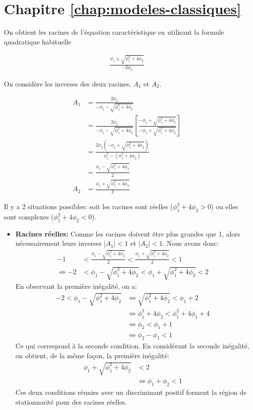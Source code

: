 \section*{Chapitre \ref{chap:modeles-classiques}}

\begin{solution}{2.1}
  On obtient les racines de l'équation caractéristique en utilisant la formule quadratique habituelle

\begin{align*}
\frac{\phi_1\pm\sqrt{\phi_1^2+4\phi_2}}{-2\phi_2}
\end{align*}

On considère les inverses des deux racines, $A_1$ et $A_2$.

\begin{align*}
A_1 &= \frac{2\phi_2}{-\phi_1-\sqrt{\phi_1^2+4\phi_2}} \\
&= \frac{2\phi_2}{-\phi_1-\sqrt{\phi_1^2+4\phi_2}} \left[\frac{-\phi_1+\sqrt{\phi_1^2+4\phi_2}}{-\phi_1+\sqrt{\phi_1^2+4\phi_2}} \right] \\
&= \frac{2\phi_2(-\phi_1+\sqrt{\phi_1^2+4\phi_2})}{\phi_1^2-(\phi_1^2+4\phi_2)}\\
&= \frac{\phi_1-\sqrt{\phi_1^2+4\phi_2}}{2}\\
A_2 &= \frac{\phi_1+\sqrt{\phi_1^2+4\phi_2}}{2}
\end{align*}

Il y a 2 situations possibles: soit les racines sont réelles ($\phi_1^2+4\phi_2>0$) ou elles sont complexes ($\phi_1^2+4\phi_2<0$).
\begin{itemize}
\item \textbf{Racines réelles:}
Comme les racines doivent être plus grandes que 1, alors nécessairement leurs inverses $|A_1|<1$ et $|A_2|<1$. Nous avons donc:
\begin{align*}
-1 &< \frac{\phi_1-\sqrt{\phi_1^2+4\phi_2}}{2} <  \frac{\phi_1+\sqrt{\phi_1^2+4\phi_2}}{2} < 1 \\
\Leftrightarrow -2 &< \phi_1-\sqrt{\phi_1^2+4\phi_2} < \phi_1+\sqrt{\phi_1^2+4\phi_2} < 2
\end{align*}
En observant la première inégalité, on a:
\begin{align*}
-2 < \phi_1-\sqrt{\phi_1^2+4\phi_2}
&\Leftrightarrow \sqrt{\phi_1^2+4\phi_2}<\phi_1+2 \\
&\Leftrightarrow \phi_1^2+4\phi_2 < \phi_1^2+4\phi_1+4 \\
&\Leftrightarrow \phi_2 < \phi_1 + 1 \\
&\Leftrightarrow \phi_2 - \phi_1 < 1
\end{align*}
Ce qui correspond à la seconde condition. En considérant la seconde inégalité, on obtient, de la même façon, la première inégalité:
\begin{align*}
\phi_1+\sqrt{\phi_1^2+4\phi_2} &< 2 \\
&\Leftrightarrow \phi_1 + \phi_2 < 1
\end{align*}
Ces deux conditions réunies avec un discriminant positif forment la région de stationnarité pour des racines réelles.


\end{itemize}
\end{solution}

